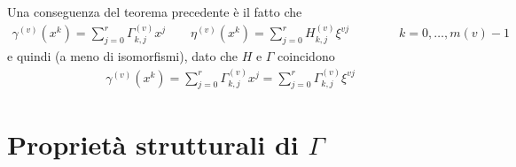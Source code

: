 Una conseguenza del teorema precedente è il fatto che 
\begin{align*}
   \gamma^{(v)}(x^{k}) = \sum_{j=0}^{r} \Gamma_{k,j}^{(v)} x^{j} 
   \qquad 
   \eta^{(v)}(x^{k}) = \sum_{j=0}^{r} H_{k,j}^{(v)} \xi^{vj}
   \qquad\qquad 
   k = 0,\dots , m(v)-1
\end{align*}
e quindi (a meno di isomorfismi), dato che $H$ e $\Gamma$ coincidono
\begin{align*}
   \gamma^{(v)}(x^{k}) = \sum_{j=0}^{r} \Gamma_{k,j}^{(v)} x^{j} = \sum_{j=0}^{r} \Gamma_{k,j}^{(v)} \xi^{vj}
\end{align*}

\section{Proprietà strutturali di $\Gamma$}

